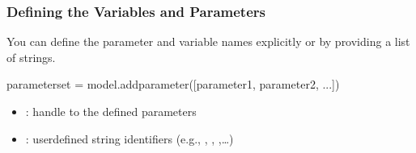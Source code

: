 \documentclass[letterpaper,10pt,english,openany,oneside]{sphinxmanual}
\begin{document}
\begin{sphinxVerbatim}[commandchars=\\\{\}]
 

  
     
     
     
     
     

    
\end{sphinxVerbatim}


\subsubsection{Defining the Variables and Parameters}
\label{\detokenize{user-guide/defining-the-problem:defining-the-variables-and-parameters}}
\sphinxAtStartPar
You can define the parameter and variable names explicitly or by providing a list of strings.

\begin{sphinxVerbatim}[commandchars=\\\{\}]
parameter\PYGZus{}set = model.add\PYGZus{}parameter([parameter\PYGZus{}1, parameter\PYGZus{}2, ...])
\end{sphinxVerbatim}
\begin{itemize}
\item {} 
\sphinxAtStartPar
{}: handle to the defined parameters

\item {} 
\sphinxAtStartPar
{}: user\sphinxhyphen{}defined string identifiers (e.g., , , ,…)

\end{itemize}
\end{document}

